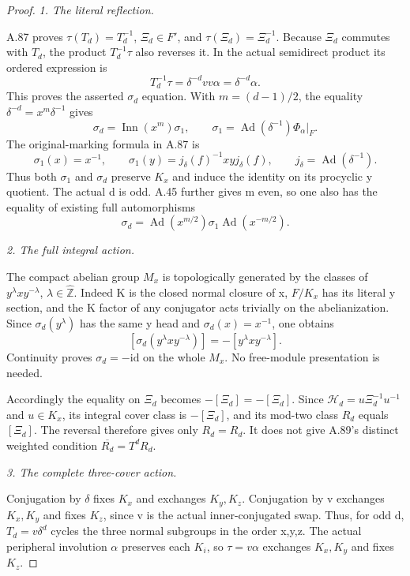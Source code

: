 \begin{proof}
\emph{1. The literal reflection.}\par
A.87 proves \(\tau(T_d)=T_d^{-1}\), \(\Xi_d\in F'\),
and \(\tau(\Xi_d)=\Xi_d^{-1}\).
Because \(\Xi_d\) commutes with \(T_d\), the product
\(T_d^{-1}\tau\) also reverses it. In the actual semidirect
product its ordered expression is
\[
                  T_d^{-1}\tau
                    =\delta^{-d}vv\alpha=\delta^{-d}\alpha.
 \tag{A.91.6}
\]
This proves the asserted \(\sigma_d\) equation.
With \(m=(d-1)/2\), the equality
\(\delta^{-d}=x^m\delta^{-1}\) gives
\[
 \sigma_d=\operatorname{Inn}(x^m)\sigma_1,\qquad
 \sigma_1=\operatorname{Ad}(\delta^{-1})\Phi_\alpha|_F.
 \tag{A.91.7}
\]
The original-marking formula in A.87 is
\[
 \sigma_1(x)=x^{-1},\qquad
 \sigma_1(y)=j_\delta(f)^{-1}xyj_\delta(f),\qquad
 j_\delta=\operatorname{Ad}(\delta^{-1}).
 \tag{A.91.8}
\]
Thus both \(\sigma_1\) and \(\sigma_d\) preserve \(K_x\)
and induce the identity on its procyclic y quotient.
The actual d is odd. A.45 further gives m even, so one
also has the equality of existing full automorphisms
\[
 \sigma_d
   =\operatorname{Ad}(x^{m/2})\sigma_1
        \operatorname{Ad}(x^{-m/2}).
 \tag{A.91.9}
\]

\emph{2. The full integral action.}\par
The compact abelian group \(M_x\) is topologically generated
by the classes of \(y^\lambda x y^{-\lambda}\),
\(\lambda\in\widehat{\mathbb Z}\). Indeed K is the closed
normal closure of x, \(F/K_x\) has its literal y section,
and the K factor of any conjugator acts trivially on the
abelianization. Since \(\sigma_d(y^\lambda)\) has the same
y head and \(\sigma_d(x)=x^{-1}\), one obtains
\[
 [\sigma_d(y^\lambda x y^{-\lambda})]
       =-[y^\lambda x y^{-\lambda}].
 \tag{A.91.10}
\]
Continuity proves \(\sigma_d=-\mathrm{id}\) on the whole
\(M_x\). No free-module presentation is needed.

Accordingly the equality on \(\Xi_d\) becomes
\(-[\Xi_d]=-[\Xi_d]\). Since
\(\mathcal H_d=u\Xi_d^{-1}u^{-1}\) and \(u\in K_x\),
its integral cover class is \(-[\Xi_d]\), and its
mod-two class \(R_d\) equals \([\Xi_d]\).
The reversal therefore gives only \(R_d=R_d\).
It does not give A.89's distinct weighted condition
\(\overline{R_d}=T^dR_d\).

\emph{3. The complete three-cover action.}\par
Conjugation by \(\delta\) fixes \(K_x\) and exchanges
\(K_y,K_z\). Conjugation by v exchanges \(K_x,K_y\)
and fixes \(K_z\), since v is the actual inner-conjugated
swap. Thus, for odd d, \(T_d=v\delta^d\) cycles the
three normal subgroups in the order x,y,z.
The actual peripheral involution \(\alpha\) preserves
each \(K_i\), so \(\tau=v\alpha\) exchanges \(K_x,K_y\)
and fixes \(K_z\).


\end{proof}

